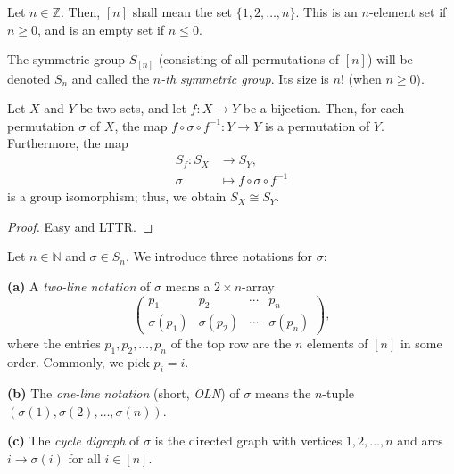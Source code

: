 \begin{definition}
\label{def.perm.Sn-iven}
\leantarget
\leanok
Let $n \in \mathbb{Z}$. Then, $[n]$ shall mean the set $\{1, 2, \ldots, n\}$.
This is an $n$-element set if $n \ge 0$, and is an empty set if $n \le 0$.

The symmetric group $S_{[n]}$ (consisting of all permutations of $[n]$) will
be denoted $S_n$ and called the $n$\emph{-th symmetric group}. Its size is
$n!$ (when $n \ge 0$).
\end{definition}

\begin{proposition}
\label{prop.perm.Sf}
\leantarget
\leanok
Let $X$ and $Y$ be two sets, and let $f : X \to Y$ be a bijection.
Then, for each permutation $\sigma$ of $X$, the map
$f \circ \sigma \circ f^{-1} : Y \to Y$ is a permutation of $Y$.
Furthermore, the map
\begin{align*}
S_f : S_X &\to S_Y, \\
\sigma &\mapsto f \circ \sigma \circ f^{-1}
\end{align*}
is a group isomorphism; thus, we obtain $S_X \cong S_Y$.
\end{proposition}

\begin{proof}
Easy and LTTR.
\end{proof}

\begin{definition}
\label{def.perm.notations}
\leantarget
\leanok
Let $n \in \mathbb{N}$ and $\sigma \in S_n$. We introduce three notations
for $\sigma$:

\textbf{(a)} A \emph{two-line notation} of $\sigma$ means a $2 \times n$-array
\[
\begin{pmatrix}
p_1 & p_2 & \cdots & p_n \\
\sigma(p_1) & \sigma(p_2) & \cdots & \sigma(p_n)
\end{pmatrix},
\]
where the entries $p_1, p_2, \ldots, p_n$ of the top row are the $n$
elements of $[n]$ in some order. Commonly, we pick $p_i = i$.

\textbf{(b)} The \emph{one-line notation} (short, \emph{OLN}) of $\sigma$
means the $n$-tuple $(\sigma(1), \sigma(2), \ldots, \sigma(n))$.

\textbf{(c)} The \emph{cycle digraph} of $\sigma$ is the
directed graph with vertices $1, 2, \ldots, n$ and arcs $i \to
\sigma(i)$ for all $i \in [n]$.
\end{definition}

